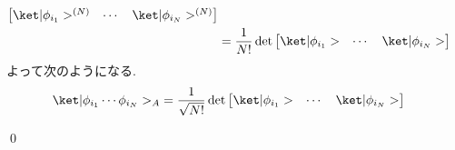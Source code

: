 \documentclass[uplatex,dvipdfmx,a4paper,11pt]{jlreq}
\makeatletter
\DeclareMathOperator{\Det}{det}
\numberwithin{equation}{section}
\theoremstyle{definition}
\renewenvironment{proof}[1][\proofname]{\par
  \normalfont
  \topsep6\p@\@plus6\p@ \trivlist
  \item[\hskip\labelsep{\bfseries #1}\@addpunct{\bfseries}]\ignorespaces\quad\par
}{
  \qed\endtrivlist\@endpefalse
}
\renewcommand\proofname{証明}
\makeatother
\begin{document}
\begin{proof}
\begin{align}
\begin{bmatrix}
                                                                               \ket|\phi_{i_1}>^{(N)} & \cdots & \ket|\phi_{i_N}>^{(N)}
                                                                             \end{bmatrix}                                      \\
                                                         & = \frac{1}{N!}\Det\begin{bmatrix}
                                                                               \ket|\phi_{i_1}> & \cdots & \ket|\phi_{i_N}>
                                                                             \end{bmatrix}
  \end{align}
  よって次のようになる.
  \begin{align}
    \ket|\phi_{i_1}\cdots\phi_{i_N}>_A & = \frac{1}{\sqrt{N!}}\Det\begin{bmatrix}\ket|\phi_{i_1}> & \cdots & \ket|\phi_{i_N}>\end{bmatrix}
  \end{align}
\end{proof}
\end{document}
